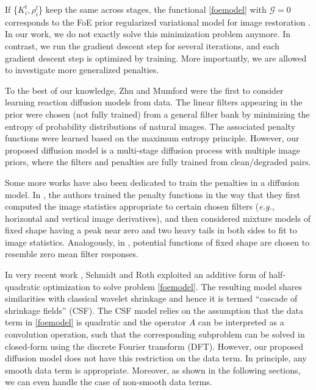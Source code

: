 \documentclass[10pt,journal,compsoc]{IEEEtran}
\newcommand{\cG}{\mathcal{G}}
\newcommand{\eg}{\emph{e.g.}}
\begin{document}
{If \{$K_i^t, \rho_i^t$\} keep the same across stages, 
the functional \eqref{foemodel} with $\cG = 0$ corresponds to 
the FoE prior regularized variational model for image
restoration \cite{RothFOE2009, ChenRP14, ChenPRB13}.  In our work, we
do not exactly solve this minimization problem anymore. In
contrast, we run the gradient descent step for several iterations, and
each gradient descent step is optimized by training. 
More importantly, we are allowed to investigate more generalized penalties. 

To the best of our knowledge, Zhu and Mumford \cite{zhu1997prior} were
the first to consider learning reaction diffusion models from data. The linear filters appearing in the prior 
were chosen (not fully trained) from a general filter bank by minimizing the entropy 
of probability distributions of natural images. The associated penalty functions were learned based on the maximum entropy principle. 
However, our proposed diffusion model is a multi-stage diffusion process with 
multiple image priors, where the filters and penalties are fully trained from clean/degraded pairs. 

Some more works have also been dedicated to train the penalties in a diffusion 
model. In \cite{KrajsekS10}, the authors trained the penalty functions in the way that 
they first computed the image statistics appropriate to certain 
chosen filters (\eg, horizontal and vertical image derivatives), and then 
considered mixture models of fixed shape having a peak near zero and two heavy tails 
in both sides to fit to image statistics. 
Analogously, in \cite{ScharrBH03}, potential functions of fixed shape are chosen to 
resemble zero mean filter responses. 

In very recent work \cite{CSF2014}, Schmidt and Roth exploited an additive form of half-quadratic optimization to solve problem \eqref{foemodel}. The resulting model shares similarities with classical wavelet shrinkage and hence it is termed ``cascade of shrinkage fields'' (CSF). 
The CSF model relies on the assumption that the data term in \eqref{foemodel} is quadratic and the operator $A$ can 
be interpreted as a convolution operation, such that the corresponding subproblem can be solved in closed-form using the discrete Fourier transform (DFT). However, our proposed diffusion model does not have this restriction on the data term. In principle, any smooth data term is appropriate. Moreover, as shown in the following sections, we can even handle the case of non-smooth data terms. 

}
\end{document}
